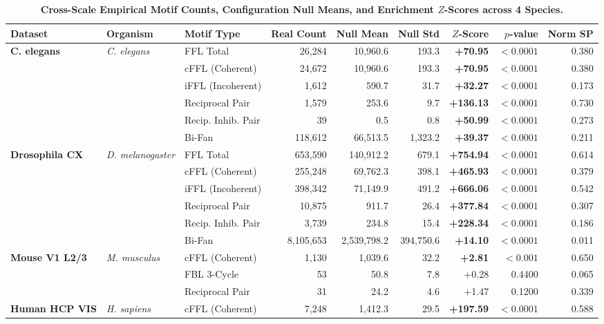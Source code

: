 \documentclass[10pt,twocolumn,letterpaper]{article}
\begin{document}
\begin{table}[t]
\centering
\small
\caption{\textbf{Cross-Scale Empirical Motif Counts, Configuration Null Means, and Enrichment $Z$-Scores across 4 Species.}}
\label{tab:motifs}
\begin{tabular}{lllrrrrrr}
\toprule
\textbf{Dataset} & \textbf{Organism} & \textbf{Motif Type} & \textbf{Real Count} & \textbf{Null Mean} & \textbf{Null Std} & \textbf{$Z$-Score} & \textbf{$p$-value} & \textbf{Norm SP} \\
\midrule
\textbf{C. elegans} & \textit{C. elegans} & FFL Total & 26,284 & 10,960.6 & 193.3 & \textbf{+70.95} & $<0.0001$ & 0.380 \\
& & cFFL (Coherent) & 24,672 & 10,960.6 & 193.3 & \textbf{+70.95} & $<0.0001$ & 0.380 \\
& & iFFL (Incoherent) & 1,612 & 590.7 & 31.7 & \textbf{+32.27} & $<0.0001$ & 0.173 \\
& & Reciprocal Pair & 1,579 & 253.6 & 9.7 & \textbf{+136.13} & $<0.0001$ & 0.730 \\
& & Recip. Inhib. Pair & 39 & 0.5 & 0.8 & \textbf{+50.99} & $<0.0001$ & 0.273 \\
& & Bi-Fan & 118,612 & 66,513.5 & 1,323.2 & \textbf{+39.37} & $<0.0001$ & 0.211 \\
\midrule
\textbf{Drosophila CX} & \textit{D. melanogaster} & FFL Total & 653,590 & 140,912.2 & 679.1 & \textbf{+754.94} & $<0.0001$ & 0.614 \\
& & cFFL (Coherent) & 255,248 & 69,762.3 & 398.1 & \textbf{+465.93} & $<0.0001$ & 0.379 \\
& & iFFL (Incoherent) & 398,342 & 71,149.9 & 491.2 & \textbf{+666.06} & $<0.0001$ & 0.542 \\
& & Reciprocal Pair & 10,875 & 911.7 & 26.4 & \textbf{+377.84} & $<0.0001$ & 0.307 \\
& & Recip. Inhib. Pair & 3,739 & 234.8 & 15.4 & \textbf{+228.34} & $<0.0001$ & 0.186 \\
& & Bi-Fan & 8,105,653 & 2,539,798.2 & 394,750.6 & \textbf{+14.10} & $<0.0001$ & 0.011 \\
\midrule
\textbf{Mouse V1 L2/3} & \textit{M. musculus} & cFFL (Coherent) & 1,130 & 1,039.6 & 32.2 & \textbf{+2.81} & $<0.001$ & 0.650 \\
& & FBL 3-Cycle & 53 & 50.8 & 7.8 & +0.28 & 0.4400 & 0.065 \\
& & Reciprocal Pair & 31 & 24.2 & 4.6 & +1.47 & 0.1200 & 0.339 \\
\midrule
\textbf{Human HCP VIS} & \textit{H. sapiens} & cFFL (Coherent) & 7,248 & 1,412.3 & 29.5 & \textbf{+197.59} & $<0.0001$ & 0.588 \\

\end{tabular}
\end{table}
\end{document}
